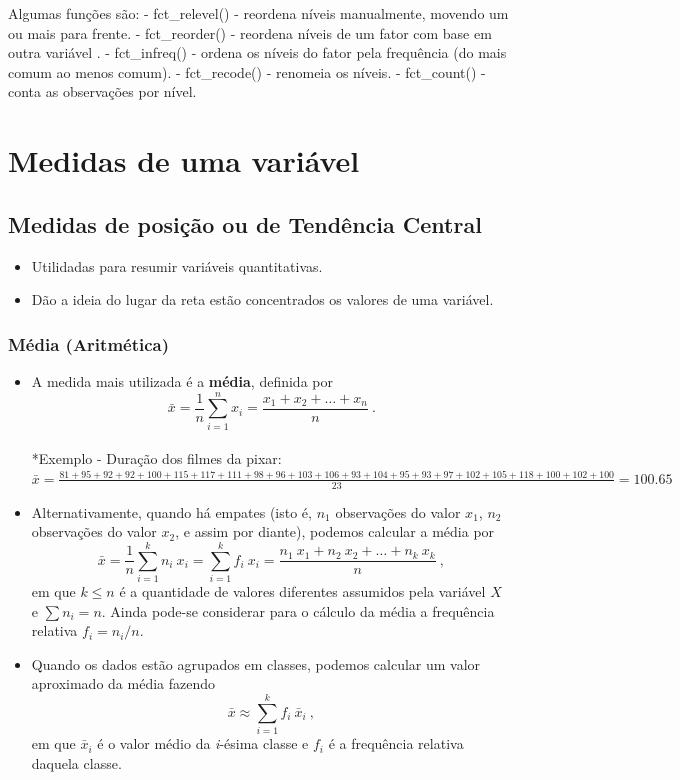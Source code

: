 \documentclass[
]{book}
\providecommand{\tightlist}{%
  \setlength{\itemsep}{0pt}\setlength{\parskip}{0pt}}
\begin{document}
Algumas funções são:
- fct\_relevel() - reordena níveis manualmente, movendo um ou mais para frente.
- fct\_reorder() - reordena níveis de um fator com base em outra variável .
- fct\_infreq() - ordena os níveis do fator pela frequência (do mais comum ao menos comum).
- fct\_recode() - renomeia os níveis.
- fct\_count() - conta as observações por nível.

\chapter{Medidas de uma variável}\label{medidas_uma_variavel_5}

\section{Medidas de posição ou de Tendência Central}\label{medidas-de-posiuxe7uxe3o-ou-de-tenduxeancia-central}

\begin{itemize}
\tightlist
\item
  Utilidadas para resumir variáveis quantitativas.\\
\item
  Dão a ideia do lugar da reta estão concentrados os valores de uma variável.
\end{itemize}

\subsection{Média (Aritmética)}\label{muxe9dia-aritmuxe9tica}

\begin{itemize}
\item
  A medida mais utilizada é a \textbf{média}, definida por \[\displaystyle \bar{x} = \frac{1}{n}\sum_{i=1}^n x_i = \dfrac{x_1+x_2+\ldots+x_n}{n}~.\]\\
  *Exemplo - Duração dos filmes da pixar: \(\bar{x} = \frac{81+95+92+92+100+115+117+111+98+96+103+106+93+104+95+93+97+102+105+118+100+102+100}{23}=100.65\)
\item
  Alternativamente, quando há empates (isto é, \(n_1\) observações do valor \(x_1\), \(n_2\) observações do valor \(x_2\), e assim por diante), podemos calcular a média por \[\displaystyle \bar{x} = \frac{1}{n}\sum_{i=1}^k n_i~x_i = \sum_{i=1}^k f_i~x_i = \frac{n_1~x_1+n_2~x_2+\ldots+n_k~x_k}{n}~,\] em que \(k\leq n\) é a quantidade de valores diferentes assumidos pela variável \(X\) e \(\sum n_i = n\). Ainda pode-se considerar para o cálculo da média a frequência relativa \(f_i = n_i/n\).
\item
  Quando os dados estão agrupados em classes, podemos calcular um valor aproximado da média fazendo \[\displaystyle \bar{x} \approx \sum_{i=1}^k f_i~\bar{x}_i~,\] em que \(\bar{x}_i\) é o valor médio da \emph{i}-ésima classe e \(f_i\) é a frequência relativa daquela classe.
\end{itemize}
\end{document}
